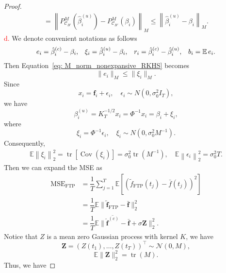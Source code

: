 \begin{proof}
\begin{equation}
\begin{aligned}
        =
        \left\|
        P_{\mathcal C_{B'}}^{M}
        \left(
        \hat{\beta}_i^{(u)}
        \right)
        -
        P_{\mathcal C_{B'}}^{M}(\beta_i)
        \right\|_M
        \leq
        \left\|
        \hat{\beta}_i^{(u)}-\beta_i
        \right\|_M.
    \end{aligned}
    \label{eq: M_norm_nonexpansive_RKHS}
\end{equation}
\textcolor{red}{d.} 
We denote convenient notations as follows
\begin{equation}
    \begin{aligned}
        e_i = \hat{\beta}_i^{(c)} - \beta_i, &&
        \xi_i = \hat{\beta}_i^{(u)} - \beta_i, &&
        r_i = \hat{\beta}_i^{(c)} - \hat{\beta}_i^{(u)}, &&
        b_i = \operatorname*{\mathbb{E}} e_i.
    \end{aligned}
    \label{eq: notations_RKHS}
\end{equation}
Then Equation~\eqref{eq: M_norm_nonexpansive_RKHS} becomes
\begin{equation}
    \|e_i\|_M\leq \|\xi_i\|_M.
    \label{eq: M_norm_nonexpansive_RKHS_simplified}
\end{equation}
Since
\[
x_i=\mathbf f_i+\epsilon_i,\quad
\epsilon_i\sim N(0,\sigma_0^2 I_T),
\]
we have
\[
\beta_i^{(u)}
=K_T^{-1/2} x_i
=
\Phi^{-1}x_i
=
\beta_i+\xi_i,
\]
where
\[
\xi_i
=
\Phi^{-1}\epsilon_i,\quad
\xi_i
\sim
N(0,\sigma_0^2M^{-1}).
\]
Consequently,
\begin{align}
\mathbb E
\left\|
\xi_i
\right\|_2^2
=
\operatorname{tr}
\left[
\operatorname{Cov}
\left(
\xi_i
\right)
\right]
=
\sigma_0^2\operatorname{tr}(M^{-1}),
\quad
\mathbb E
\left\|
\epsilon_i
\right\|_2^2
=\sigma_0^2 T.
\label{eq: unconstrained_mse_RKHS}
\end{align}
Then we can expand the MSE as
\begin{align}
\mathrm{MSE}_{\mathrm{FTP}}
&= 
\dfrac{1}{T} \sum_{j=1}^T \mathbb{E} 
[(\widetilde{f}_{\mathrm{FTP}}(t_j)-\bar{f}(t_j))^2]\nonumber\\
&= 
\dfrac{1}{T} \mathbb{E} 
\|\widetilde{\mathbf{f}}_{\mathrm{FTP}} - \bar{\mathbf{f}}\|_2^2\nonumber\\
&= 
\dfrac{1}{T} \mathbb{E} 
\|\overline{\hat{\mathbf{f}}^{(c)}} - \bar{\mathbf{f}} + \sigma \mathbf{Z}\|_2^2
\label{eq: direct expand MSE}.
\end{align}
Notice that $Z$ is a mean zero Gaussian process with kernel $K$, we have
\[
\mathbf{Z} = (Z(t_1),\ldots,Z(t_T))^\top
\sim \mathcal{N}(0,M),
\]
\[
\mathbb E\|\mathbf{Z}\|_2^2 = \operatorname{tr}(M).
\]
Thus, we have

\end{proof}
